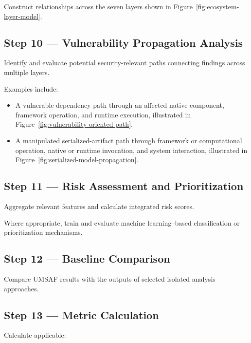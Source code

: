 \documentclass[
  12pt,
  letterpaper,
  oneside]{report}
\begin{document}
Construct relationships across the seven layers shown in
Figure~\ref{fig:ecosystem-layer-model}.

\subsection{Step 10 --- Vulnerability Propagation
Analysis}\label{step-10--vulnerability-propagation-analysis}

Identify and evaluate potential security-relevant paths connecting
findings across multiple layers.

Examples include:

\begin{itemize}
\item
  A vulnerable-dependency path through an affected native component,
  framework operation, and runtime execution, illustrated in
  Figure~\ref{fig:vulnerability-oriented-path}.
\item
  A manipulated serialized-artifact path through framework or
  computational operation, native or runtime invocation, and system
  interaction, illustrated in
  Figure~\ref{fig:serialized-model-propagation}.
\end{itemize}

\subsection{Step 11 --- Risk Assessment and
Prioritization}\label{step-11--risk-assessment-and-prioritization}

Aggregate relevant features and calculate integrated risk scores.

Where appropriate, train and evaluate machine learning--based
classification or prioritization mechanisms.

\subsection{Step 12 --- Baseline
Comparison}\label{step-12--baseline-comparison}

Compare UMSAF results with the outputs of selected isolated analysis
approaches.

\subsection{Step 13 --- Metric
Calculation}\label{step-13--metric-calculation}

Calculate applicable:
\end{document}

